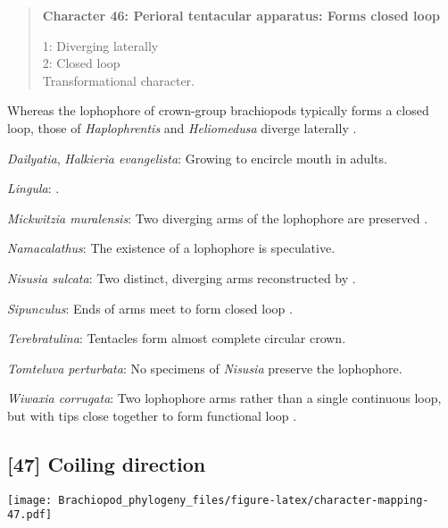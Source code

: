 \documentclass[openany]{book}
\theoremstyle{definition}
\theoremstyle{definition}
\theoremstyle{definition}
\theoremstyle{remark}
\begin{document}
\begin{quote}
\textbf{Character 46: Perioral tentacular apparatus: Forms closed loop}

1: Diverging laterally\\
2: Closed loop\\
Transformational character.
\end{quote}

Whereas the lophophore of crown-group brachiopods typically forms a
closed loop, those of \emph{Haplophrentis} and \emph{Heliomedusa}
diverge laterally \citep{Moysiuk2017Hyolithsare}.

\hypertarget{Dailyatia-coding-46}{}
\emph{Dailyatia}, \emph{Halkieria evangelista}: Growing to encircle
mouth in adults.

\hypertarget{Lingula-coding-46}{}
\emph{Lingula}: \citet{Nielsen1966}.

\hypertarget{Mickwitzia_muralensis-coding-46}{}
\emph{Mickwitzia muralensis}: Two diverging arms of the lophophore are
preserved \citep{Balthasar2009EarlyCambrian}.

\hypertarget{Namacalathus-coding-46}{}
\emph{Namacalathus}: The existence of a lophophore is speculative.

\hypertarget{Nisusia_sulcata-coding-46}{}
\emph{Nisusia sulcata}: Two distinct, diverging arms reconstructed by
\citet{Zhang2007Agregarious}.

\hypertarget{Sipunculus-coding-46}{}
\emph{Sipunculus}: Ends of arms meet to form closed loop
\citep{Temereva2016Thenervous}.

\hypertarget{Terebratulina-coding-46}{}
\emph{Terebratulina}: Tentacles form almost complete circular crown.

\hypertarget{Tomteluva_perturbata-coding-46}{}
\emph{Tomteluva perturbata}: No specimens of \emph{Nisusia} preserve the
lophophore.

\hypertarget{Wiwaxia_corrugata-coding-46}{}
\emph{Wiwaxia corrugata}: Two lophophore arms rather than a single
continuous loop, but with tips close together to form functional loop
\citep{Torrey1901}.

\subsection*{{[}47{]} Coiling direction}\label{coiling-direction}

\texttt{[image: Brachiopod\_phylogeny\_files/figure-latex/character-mapping-47.pdf]}
\end{document}
